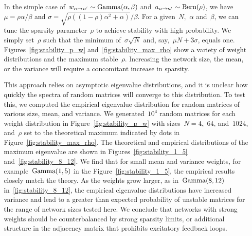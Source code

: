 
In the simple case of~${w_{n \to n'}\sim \mathrm{Gamma}(\alpha,\beta)}$
and~${a_{n \to n'}\sim\mathrm{Bern}(\rho)}$, we have ${\mu = \rho
  \alpha/\beta}$ and
${\sigma=\sqrt{\rho((1-\rho)\alpha^2+\alpha)}/\beta}$. For a
given~$N$,~$\alpha$ and~$\beta$, we can tune the sparsity
parameter~$\rho$ to achieve stability with high probability. We simply
set~$\rho$ such that the minimum of~$\sigma\sqrt{N}$ and, say,~${\mu N
  + 3\sigma}$, equals one. Figures~\ref{fig:stability_p_w}
and~\ref{fig:stability_max_rho} show a variety of weight distributions
and the maximum stable~$\rho$. Increasing the network size, the mean,
or the variance will require a concomitant increase in sparsity.

This approach relies on asymptotic eigenvalue distributions, and it is
unclear how quickly the spectra of random matrices will converge to
this distribution. To test this, we computed the empirical eigenvalue
distribution for random matrices of various size, mean, and
variance. We generated~$10^4$ random matrices for each weight
distribution in Figure~\ref{fig:stability_p_w} with sizes~$N=4$,~$64$,
and~$1024$, and~$\rho$ set to the theoretical maximum indicated by
dots in Figure~\ref{fig:stability_max_rho}. The theoretical and
empirical distributions of the maximum eigenvalue are shown in
Figures~\ref{fig:stability_1_5} and~\ref{fig:stability_8_12}. We find
that for small mean and variance weights, for
example~$\mathrm{Gamma}(1,5)$ in the Figure~\ref{fig:stability_1_5}, the
empirical results closely match the theory. As the weights grow
larger, as in~${\mathrm{Gamma}(8,12)}$ in~\ref{fig:stability_8_12}, the
empirical eigenvalue distributions have increased variance and lead to
a greater than expected probability of unstable matrices for the range
of network sizes tested here. We conclude that networks with strong
weights should be counterbalanced by strong sparsity limits, or
additional structure in the adjacency matrix that prohibits excitatory
feedback loops.

